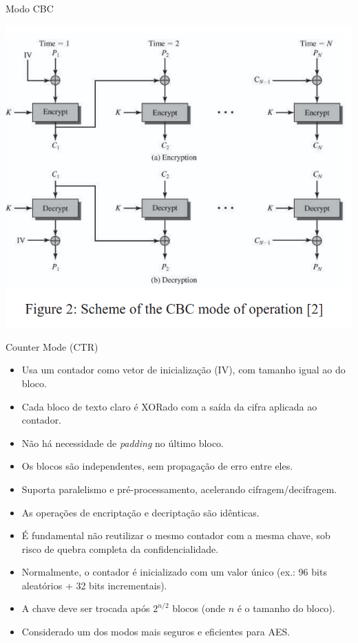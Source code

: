 \begin{frame}{Modo CBC}


\centering
    \includegraphics[width=0.6\linewidth]{Figuras/aes-modo-cbc.png}
    
\end{frame}

\begin{frame}{Counter Mode (CTR)}
    \begin{itemize}
        \item Usa um contador como vetor de inicialização (IV), com tamanho igual ao do bloco.
        \item Cada bloco de texto claro é XORado com a saída da cifra aplicada ao contador.
        \item Não há necessidade de \textit{padding} no último bloco.
        \item Os blocos são independentes, sem propagação de erro entre eles.
        \item Suporta paralelismo e pré-processamento, acelerando cifragem/decifragem.
        \item As operações de encriptação e decriptação são idênticas.
        \item É fundamental não reutilizar o mesmo contador com a mesma chave, sob risco de quebra completa da confidencialidade.
        \item Normalmente, o contador é inicializado com um valor único (ex.: 96 bits aleatórios + 32 bits incrementais).
        \item A chave deve ser trocada após $2^{n/2}$ blocos (onde $n$ é o tamanho do bloco).
        \item Considerado um dos modos mais seguros e eficientes para AES.
    \end{itemize}
\end{frame}

